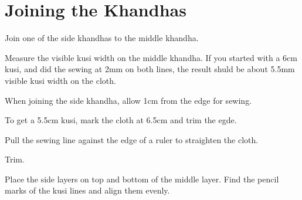 \begin{multicols}{2}

\setlength{\nextPhotoWidth}{0.8\linewidth}


\columnbreak

\setlength{\nextPhotoWidth}{\linewidth}


\end{multicols}

\clearpage

\section{Joining the Khandhas}

Join one of the side khandhas to the middle khandha.

\setlength{\nextPhotoWidth}{0.5\textwidth}


Measure the visible kusi width on the middle khandha. If you started
with a 6cm kusi, and did the sewing at 2mm on both lines, the result
shuld be about 5.5mm visible kusi width on the cloth.

When joining the side khandha, allow 1cm from the edge for sewing.

To get a 5.5cm kusi, mark the cloth at 6.5cm and trim the egde.

\setlength{\nextPhotoWidth}{0.4\textwidth}


\clearpage

Pull the sewing line against the edge of a ruler to straighten the
cloth.


Trim.


\clearpage

Place the side layers on top and bottom of the middle layer. Find the
pencil marks of the kusi lines and align them evenly.



